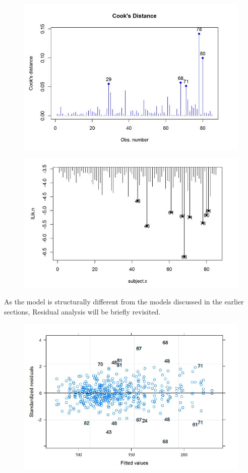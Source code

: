 \documentclass[12pt, a4paper]{report}
\theoremstyle{plain}
\theoremstyle{definition}
\theoremstyle{remark}
\begin{document}
	
	\begin{figure}[h!]
		\centering
		\includegraphics[width=0.7\linewidth]{images/CooksDistancePlot-JS-Roy}
		\caption{}
		\label{fig:CooksDistancePlot-JS-Roy}
	\end{figure}
	
	
	\begin{figure}[h!]
		\centering
		\includegraphics[width=0.7\linewidth]{images/LogLik-JS-Roy}
		\caption{}
		\label{fig:LogLik-JS-Roy}
	\end{figure}
	As the model is structurally different from the models discussed in the earlier sections, Residual analysis will be briefly revisited.
	\begin{figure}[h!]
		\centering
		\includegraphics[width=0.7\linewidth]{images/Residuals-JS-Roy}
		\caption{}
		\label{fig:Residuals-JS-Roy}
	\end{figure}
	
\end{document}
